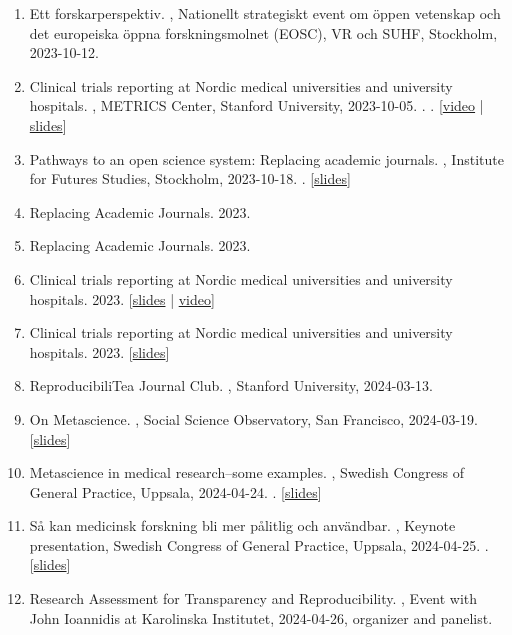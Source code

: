 \documentclass[10pt,a4paper,twocolumn]{article}
\begin{document}
\begin{enumerate}
    \item Ett forskarperspektiv. , Nationellt strategiskt event om öppen vetenskap och det europeiska öppna forskningsmolnet (EOSC), VR och SUHF, Stockholm, 2023-10-12.

    \item Clinical trials reporting at Nordic medical universities and university hospitals. , METRICS Center, Stanford University, 2023-10-05. . . [\href{https://www.youtube.com/watch?v=RoYXvmG0KN0}{video} | \href{https://osf.io/z2cyn}{slides}]

    \item Pathways to an open science system: Replacing academic journals. , Institute for Futures Studies, Stockholm, 2023-10-18. . [\href{https://osf.io/jvw5g}{slides}]

    \item Replacing Academic Journals. 2023.

    \item Replacing Academic Journals. 2023.

    \item Clinical trials reporting at Nordic medical universities and university hospitals. 2023. [\href{https://osf.io/bh98f}{slides} | \href{https://www.youtube.com/watch?v=GBNQbQvYzjc}{video}]

    \item Clinical trials reporting at Nordic medical universities and university hospitals. 2023. [\href{https://osf.io/cdqm6}{slides}]

    \item ReproducibiliTea Journal Club. , Stanford University, 2024-03-13.

    \item On Metascience. , Social Science Observatory, San Francisco, 2024-03-19. [\href{https://osf.io/xq623}{slides}]

    \item Metascience in medical research–some examples. , Swedish Congress of General Practice, Uppsala, 2024-04-24. . [\href{https://osf.io/2xq5h}{slides}]

    \item Så kan medicinsk forskning bli mer pålitlig och användbar. , Keynote presentation, Swedish Congress of General Practice, Uppsala, 2024-04-25. . [\href{https://osf.io/j7tgk}{slides}]

    \item Research Assessment for Transparency and Reproducibility. , Event with John Ioannidis at Karolinska Institutet, 2024-04-26, organizer and panelist.


\end{enumerate}
\end{document}

